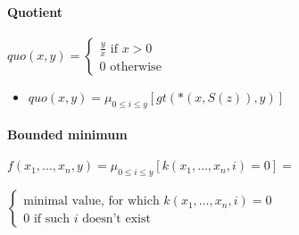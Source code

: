 \documentclass{article}
\begin{document}
\paragraph{Quotient} $quo(x,y) = 
\begin{cases}
\frac{y}{x} \mbox{ if } x>0 \\
0 \mbox{ otherwise}
\end{cases}$
\begin{itemize}[noitemsep,nolistsep]
  \item $quo(x,y) = \mu_{0 \leq i \leq y} \left[ gt(*(x,S(z)),y) \right] $
\end{itemize}



\paragraph{Bounded minimum} $f(x_1,\ldots,x_n,y) = 
\mu_{0 \leq i \leq y} \left[ k(x_1,\ldots,x_n,i) = 0 \right] = $

$\begin{cases}
\mbox{minimal value, for which } k(x_1,\ldots,x_n,i) = 0 \\
0 \mbox{ if such } i \mbox{ doesn't exist}
\end{cases}$

\end{document}
